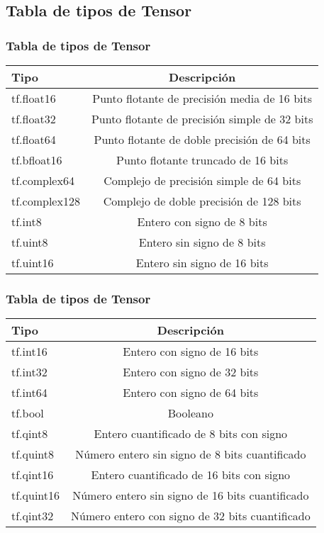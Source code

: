 \documentclass{beamer}
\begin{document}
\newpage
\subsection{Tabla de tipos de Tensor}
\begin{frame}\frametitle{Tabla de tipos de Tensor}
\begin{tabular}{|l|c|}
\hline
Tipo & Descripción\\ \hline
tf.float16 & Punto flotante de precisión media de 16 bits\\ \hline
tf.float32 & Punto flotante de precisión simple de 32 bits\\ \hline
tf.float64 & Punto flotante de doble precisión de 64 bits\\ \hline
tf.bfloat16 & Punto flotante truncado de 16 bits\\ \hline
tf.complex64 & Complejo de precisión simple de 64 bits\\ \hline
tf.complex128 & Complejo de doble precisión de 128 bits\\ \hline
tf.int8 & Entero con signo de 8 bits\\ \hline
tf.uint8 & Entero sin signo de 8 bits\\ \hline
tf.uint16 & Entero sin signo de 16 bits\\ \hline
\end{tabular}
\end{frame}

\newpage
\begin{frame}\frametitle{Tabla de tipos de Tensor}
\begin{tabular}{|l|c|}
\hline
Tipo & Descripción\\ \hline
tf.int16 & Entero con signo de 16 bits\\ \hline
tf.int32 & Entero con signo de 32 bits\\ \hline
tf.int64 & Entero con signo de 64 bits\\ \hline
tf.bool & Booleano\\ \hline
tf.qint8 & Entero cuantificado de 8 bits con signo\\ \hline
tf.quint8 & Número entero sin signo de 8 bits cuantificado\\ \hline
tf.qint16 & Entero cuantificado de 16 bits con signo\\ \hline
tf.quint16 & Número entero sin signo de 16 bits cuantificado\\ \hline
tf.qint32 & Número entero con signo de 32 bits cuantificado\\ \hline
\end{tabular}
\end{frame}
\end{document}
